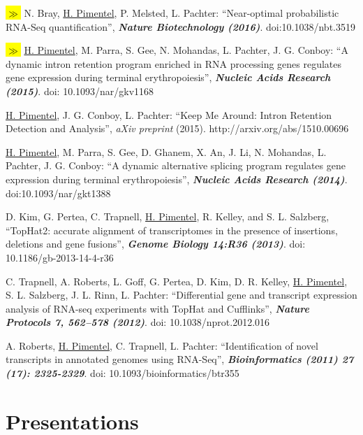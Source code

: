\documentclass[11pt,notitlepage]{article} %
\newcommand{\hlc}[2][blue]{ {\sethlcolor{#1} \hl{#2}} }
\newcommand{\hlpub}{\hlc[Dandelion]{{\color{white}$\gg$} }}
\begin{document}
\begin{etaremune}
  \item \hlpub{} N. Bray, \underline{H. Pimentel}, P. Melsted, L. Pachter: ``Near-optimal probabilistic RNA-Seq quantification'', {\bf \emph{Nature Biotechnology (2016)}}. doi:10.1038/nbt.3519

  \item \hlpub{}\underline{H. Pimentel}, M. Parra, S. Gee, N. Mohandas, L. Pachter, J. G. Conboy: ``A dynamic intron retention program enriched in RNA processing genes regulates gene expression during terminal erythropoiesis'', {\bf \emph{Nucleic Acids Research (2015)}}. doi: 10.1093/nar/gkv1168

  \item \underline{H. Pimentel}, J. G. Conboy, L. Pachter: ``Keep Me Around: Intron
Retention Detection and Analysis'', {\emph{aXiv preprint} (2015). http://arxiv.org/abs/1510.00696}

  \item \underline{H. Pimentel}, M. Parra, S. Gee, D. Ghanem, X. An, J. Li, N.
Mohandas, L. Pachter, J. G. Conboy: ``A dynamic alternative splicing program
  regulates gene expression during terminal erythropoiesis'', {\bf \emph{Nucleic
    Acids Research (2014)}}. doi:10.1093/nar/gkt1388

  \item D. Kim, G. Pertea, C. Trapnell, \underline{H. Pimentel}, R. Kelley, and S.
L. Salzberg, ``TopHat2: accurate alignment of transcriptomes in the presence of
insertions, deletions and gene fusions'', {\bf \emph{Genome Biology
    14:R36 (2013)}}. doi: 10.1186/gb-2013-14-4-r36

  \item C. Trapnell, A. Roberts, L. Goff, G. Pertea, D. Kim, D. R. Kelley,
\underline{H. Pimentel}, S. L. Salzberg, J. L. Rinn, L. Pachter: ``Differential
gene and transcript expression analysis of RNA-seq experiments with TopHat and
Cufflinks'', {\bf \emph{Nature Protocols 7, 562–578 (2012)}}. doi: 10.1038/nprot.2012.016

\item A. Roberts, \underline{H. Pimentel}, C. Trapnell, L. Pachter: ``Identification
of novel transcripts in annotated genomes using RNA-Seq'', {\bf
  \emph{Bioinformatics (2011) 27 (17): 2325-2329}}. doi: 10.1093/bioinformatics/btr355

\end{etaremune}

\section*{Presentations}
\medskip
\end{document}
